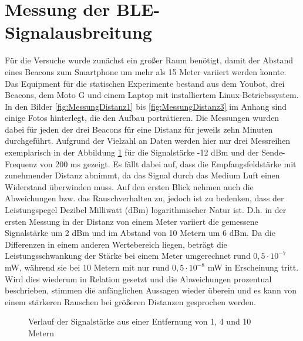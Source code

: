 \section{Messung der BLE-Signalausbreitung}\label{sec:MessungBLE}
Für die Versuche wurde zunächst ein großer Raum benötigt, damit der Abstand eines Beacons zum Smartphone um mehr als 15 Meter variiert werden konnte. Das Equipment für die statischen Experimente bestand aus dem Youbot, drei Beacons, dem Moto G und einem Laptop mit installiertem Linux-Betriebssystem. In den Bilder \ref{fig:MessungDistanz1} bis \ref{fig:MessungDistanz3} im Anhang sind einige Fotos hinterlegt, die den Aufbau porträtieren. Die Messungen wurden dabei für jeden der drei Beacons für eine Distanz für jeweils zehn Minuten durchgeführt. Aufgrund der Vielzahl an Daten werden hier nur drei Messreihen exemplarisch in der Abbildung \ref{fig:MeterNormal} für die Signalstärke -12 dBm und der Sende-Frequenz von 200 ms gezeigt. Es fällt dabei auf, dass die Empfangsfeldstärke mit zunehmender Distanz abnimmt, da das Signal durch das Medium Luft einen Widerstand überwinden muss. Auf den ersten Blick nehmen auch die Abweichungen bzw. das Rauschverhalten zu, jedoch ist zu bedenken, dass der Leistungspegel Dezibel Milliwatt (dBm) logarithmischer Natur ist. D.h. in der ersten Messung in der Distanz von einem Meter variiert die gemessene Signalstärke um 2 dBm und im Abstand von 10 Metern um 6 dBm. Da die Differenzen in einem anderen Wertebereich liegen, beträgt die Leistungsschwankung der Stärke bei einem Meter umgerechnet rund $0,5 \cdot 10^{-7}$ mW, während sie bei 10 Metern mit nur rund $0,5 \cdot 10^{-8}$ mW in Erscheinung tritt. Wird dies wiederum in Relation gesetzt und die Abweichungen prozentual beschrieben, stimmen die anfänglichen Aussagen wieder überein und es kann von einem stärkeren Rauschen bei größeren Distanzen gesprochen werden.
\begin{figure}[H] 
\centering
{}
\caption{Verlauf der Signalstärke aus einer Entfernung von 1, 4 und 10 Metern}
\label{fig:MeterNormal}
\end{figure}
